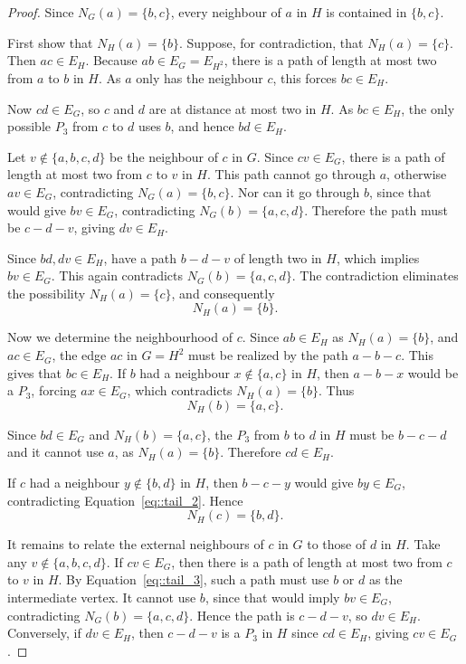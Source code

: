 \documentclass[11pt]{report}
\begin{document}
\begin{proof}
  Since $N_G(a)=\{b,c\}$, every neighbour of $a$ in $H$ is contained in $\{b,c\}$.
  
  First show that $N_H(a)=\{b\}$. Suppose, for contradiction, that $N_H(a)=\{c\}$. Then $ac \in E_H$. Because $ab \in E_G=E_{H^2}$, there is a path of length at most two from $a$ to $b$ in $H$. As $a$ only has the neighbour $c$, this forces $bc \in E_H$. 

  Now $cd \in E_G$, so $c$ and $d$ are at distance at most two in $H$. As $bc \in E_H$, the only possible $P_3$ from $c$ to $d$ uses $b$, and hence $bd \in E_H$. 

  Let $v \notin \{a,b,c,d\}$ be the neighbour of $c$ in $G$. Since $cv \in E_G$, there is a path of length at most two from $c$ to $v$ in $H$. This path cannot go through $a$, otherwise $av \in E_G$, contradicting $N_G(a)=\{b,c\}$. Nor can it go through $b$, since that would give $bv \in E_G$, contradicting $N_G(b)=\{a,c,d\}$. Therefore the path must be $c-d-v$, giving $dv \in E_H$.

  Since $bd, dv \in E_H$, have a path $b-d-v$ of length two in $H$, which implies $bv \in E_G$. This again contradicts $N_G(b)=\{a,c,d\}$. The contradiction eliminates the possibility $N_H(a)=\{c\}$, and consequently
  \begin{equation} \label{eq::tail_1}
    N_H(a)=\{b\}. 
  \end{equation}

  Now we determine the neighbourhood of $c$. Since $ab \in E_H$ as $N_H(a)=\{b\}$, and $ac\in E_G$, the edge $ac$ in $G=H^2$ must be realized by the path $a-b-c$. This gives that $bc \in E_H$. If $b$ had a neighbour $x \notin \{a,c\}$ in $H$, then $a-b-x$ would be a $P_3$, forcing $ax \in E_G$, which contradicts $N_H(a)=\{b\}$. Thus \begin{equation} \label{eq::tail_2}
    N_H(b)=\{a,c\}. 
  \end{equation}

  Since $bd\in E_G$ and $N_H(b)=\{a,c\}$, the $P_3$ from $b$ to $d$ in $H$ must be $b-c-d$ and it cannot use $a$, as $N_H(a)=\{b\}$. Therefore $cd \in E_H$. 
  
  If $c$ had a neighbour $y\notin\{b,d\}$ in $H$, then $b-c-y$ would give $by \in E_G$, contradicting Equation~\eqref{eq::tail_2}. Hence
  \begin{equation} \label{eq::tail_3}
    N_H(c)=\{b,d\}. 
  \end{equation}
  
  It remains to relate the external neighbours of $c$ in $G$ to those of $d$ in $H$. Take any $v\notin\{a,b,c,d\}$. If $cv\in E_G$, then there is a path of length at most two from $c$ to $v$ in $H$. By Equation~\eqref{eq::tail_3}, such a path must use $b$ or $d$ as the intermediate vertex. It cannot use $b$, since that would imply $bv \in E_G$, contradicting $N_G(b)=\{a,c,d\}$. Hence the path is $c-d-v$, so $dv \in E_H$. Conversely, if $dv \in E_H$, then $c-d-v$ is a $P_3$ in $H$ since $cd \in E_H$, giving $cv \in E_G$. 
  

\end{proof}
\end{document}
